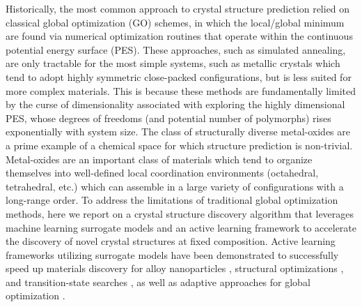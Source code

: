 %
Historically, the most common approach to crystal structure prediction relied on classical global optimization (GO) schemes,
in which the local/global minimum are found via numerical optimization routines that operate within the continuous potential energy surface (PES).%
%
These approaches, such as simulated annealing, are only tractable for the most simple systems,
such as metallic crystals which tend to adopt highly symmetric close-packed configurations, but is less suited for more complex materials.  %
%
This is because these methods are fundamentally limited by the curse of dimensionality associated with exploring the highly dimensional PES,
whose degrees of freedoms (and potential number of polymorphs) rises exponentially with system size.\cite{Stillinger1999}
%
The class of structurally diverse metal-oxides are a prime example of a chemical space for which structure prediction is non-trivial.
%
Metal-oxides are an important class of materials which tend to organize themselves into well-defined local coordination environments (octahedral, tetrahedral, etc.) which can assemble in a large variety of configurations with a long-range order.
%
To address the limitations of traditional global optimization methods,
here we report on a crystal structure discovery algorithm that leverages machine learning surrogate models and an active learning framework to accelerate the discovery of novel crystal structures at fixed composition.
%
Active learning frameworks utilizing surrogate models have been demonstrated to successfully speed up materials discovery for alloy nanoparticles \cite{Jennings2019}, structural optimizations \cite{hansen2019atomistic}, and transition-state searches \cite{torres2019low}, as well as adaptive approaches for global optimization \cite{VanDenBossche2018}.

